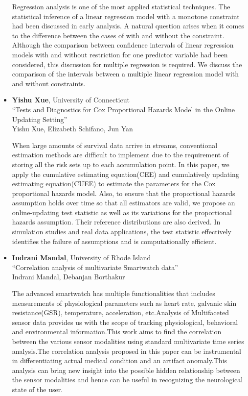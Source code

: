 \begin{itemize}
Regression analysis is one of the most applied statistical techniques. The statistical inference of a linear regression model with a monotone constraint had been discussed in early analysis. A natural question arises when it comes to the difference between the cases of with and without the constraint. Although the comparison between confidence intervals of linear regression models with and without restriction for one predictor variable had been considered, this discussion for multiple regression is required.
We discuss the comparison of the intervals between a multiple linear regression model with and without constraints.

\item \textbf{Yishu Xue}, University of Connecticut \\
``Tests and Diagnostics for Cox Proportional Hazards Model in the Online Updating Setting'' \\
Yishu Xue, Elizabeth Schifano, Jun Yan


When large amounts of survival data arrive in streams, conventional estimation
methods are difficult to implement due to the requirement of storing
all the risk sets up to each accumulation point. In this paper, we apply
the cumulative estimating equation(CEE) and cumulatively updating estimating
equation(CUEE) to estimate the parameters for the Cox proportional hazards
model. Also, to ensure that the proportional hazards assumption holds over time
so that all estimators are valid,  we propose an online-updating test statistic
 as well as its variations for the proportional hazards assumption. Their
 reference distributions are also derived. In simulation studies and real
 data applications, the test statistic effectively identifies the failure of
 assumptions and is computationally
 efficient.

\item \textbf{Indrani Mandal}, University of Rhode Island \\
``Correlation analysis of multivariate Smartwatch data'' \\
Indrani Mandal, Debanjan Borthakur


The advanced smartwatch has multiple functionalities that includes measurements of physiological parameters such as heart rate, galvanic skin resistance(GSR), temperature, acceleration, etc.Analysis of Multifaceted sensor data provides us with the scope of tracking physiological, behavioral and environmental information.This work aims to find the correlation between the various sensor modalities using standard multivariate time series analysis.The correlation analysis proposed in this paper can be instrumental in differentiating actual medical condition and an artifact anomaly.This analysis can bring new insight into the possible hidden relationship between the sensor modalities and hence can be useful in recognizing the neurological state of the user.

\end{itemize}

